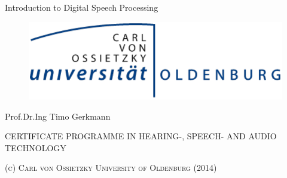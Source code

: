 \begin{titlepage}

\begin{center}

\sffamily 
\begin{LARGE}Introduction to Digital Speech Processing

\vspace{.1in}\end{LARGE}

\vspace{1.5in}

\begin{figure}[htbp]
	\centering
		\includegraphics[scale=0.8]{./Pictures/Title/UniLogoBasis_Trans.pdf}
	\label{fig:samleLogo}
\end{figure}

\vspace{1.5in}
\vfill





\vspace{.7in}

\begin{large}Prof.Dr.Ing Timo Gerkmann\end{large}

\vspace{1cm}
\sffamily
\mdseries        CERTIFICATE PROGRAMME IN HEARING-, SPEECH- AND AUDIO TECHNOLOGY %



\vspace{1cm}
\textsc{(c) Carl von Ossietzky University of Oldenburg (2014)}\\


\end{center}

\normalfont

\end{titlepage}